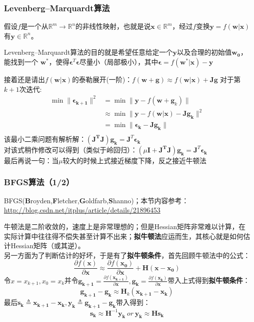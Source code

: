 \documentclass{beamer}
\begin{document}
\begin{frame}\frametitle{Levenberg–Marquardt算法}
\label{LM_Method}
假设$f$是一个从$\mathbb{R}^m \rightarrow \mathbb{R}^n$的非线性映射，也就是说$\bm{x} \in \mathbb{R}^m$，经过$f$变换$\bm{y}=f(\bm{w}|\bm{x})$有$\bm{y} \in \mathbb{R}^{n}$。

Levenberg–Marquardt算法的目的就是希望任意给定一个$\bm{y}$以及合理的初始值$\bm{w_0}$，能找到一个 $\bm{w^*}$，使得$\bm{\epsilon}^T\bm{\epsilon}$尽量小（局部极小），其中$\bm{\epsilon}=f(\bm{w^*}|\bm{x})-\bm{y}$

接着还是请出$f(\bm{w}|\bm{x})$的泰勒展开(一阶)：$f(\bm{w}+\bm{g})\approx f(\bm{w}|\bm{x})+\bm{J}\bm{g}$
对于第$k+1$次迭代:
\begin{equation}
\label{Levmar_obj}
\begin{split}
\min \|\bm{\epsilon_{k+1}}\|^{2}&=\min \|\bm{y}-f(\bm{w}+\bm{g}_k)\|\\
&\approx \min \|\bm{y}-f(\bm{w}|\bm{x})-\bm{Jg_k}\|^2\\
&=\min \|\bm{\epsilon_{k}}-\bm{Jg_k}\|\\
\end{split}
\end{equation}
该最小二乘问题有解析解：$(\bm{J^{T}J})\bm{g_k}=\bm{J}^{T}\bm{\epsilon_{k}}$\\
对该式稍作修改可以得到（类似于岭回归）：$(\mu\bm{I}+\bm{J^{T}J})\bm{g_k}=\bm{J}^{T}\bm{\epsilon_{k}}$\\
最后再说一句：当$\mu$较大的时候上式接近梯度下降，反之接近牛顿法
\end{frame}
\begin{frame}\frametitle{BFGS算法（1/2）}
\label{BFGS_Method}
BFGS(\textbf{B}royden,\textbf{F}letcher,\textbf{G}oldfarb,\textbf{S}hanno)；本节内容参考：\url{http://blog.csdn.net/itplus/article/details/21896453}

牛顿法是二阶收敛的，速度上是非常理想的；但是Hessian矩阵非常难以计算，在实际计算中往往得不偿失甚至计算不出来；\textbf{拟牛顿法}应运而生，其核心就是如何估计Hessian矩阵（或其逆）。\\
另一方面为了判断估计的好坏，于是有了\textbf{拟牛顿条件}，首先回顾牛顿法中的公式：
\begin{displaymath}
\frac{\partial f(\bm{x})}{\partial \bm{x}}\approx \frac{\partial f(\bm{x_0})}{\partial \bm{x}}+\bm{H}(\bm{x-x_0})
\end{displaymath}
令$x=x_{k+1},x_0=x_k$并令$\bm{g_{k+1}}=\frac{\partial f(\bm{x_{k+1}})}{\partial \bm{x}},\bm{g_{k}}=\frac{\partial f(\bm{x_{k}})}{\partial \bm{x}}$带入上式得到\textbf{拟牛顿条件}：
\begin{displaymath}
\bm{g_{k+1}-g_k}\approx \bm{H}_k(\bm{x_{k+1}-x_k})
\end{displaymath}
最后$\bm{s_k}\triangleq \bm{x_{k+1}-x_k},\bm{y_k}\triangleq \bm{g_{k+1}-g_k}$带入得到：
\begin{displaymath}
\bm{s_k}\approx \bm{H}^{-1}\bm{y_k}~or~\bm{y_k}\approx \bm{H}\bm{s_k}
\end{displaymath}
\end{frame}
\end{document}
